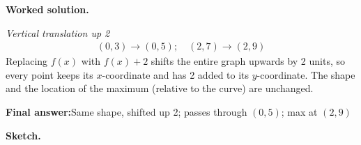 \documentclass[11pt]{article}
\begin{document}
\textbf{Worked solution.}

\textit{Vertical translation up 2}
\[\begin{gathered}
(0, 3) \to (0, 5); \quad (2, 7) \to (2, 9)
\end{gathered}\]
Replacing \( f(x) \) with \( f(x) + 2 \) shifts the entire graph upwards by 2 units, so every point keeps its \( x \)-coordinate and has 2 added to its \( y \)-coordinate. The shape and the location of the maximum (relative to the curve) are unchanged.

\begin{answerbox}
\textbf{Final answer:}\quad Same shape, shifted up 2; passes through \(\displaystyle (0,5)\); max at \(\displaystyle (2,9)\)
\end{answerbox}
\textbf{Sketch.}

\begin{center}
\end{center}
\end{document}
